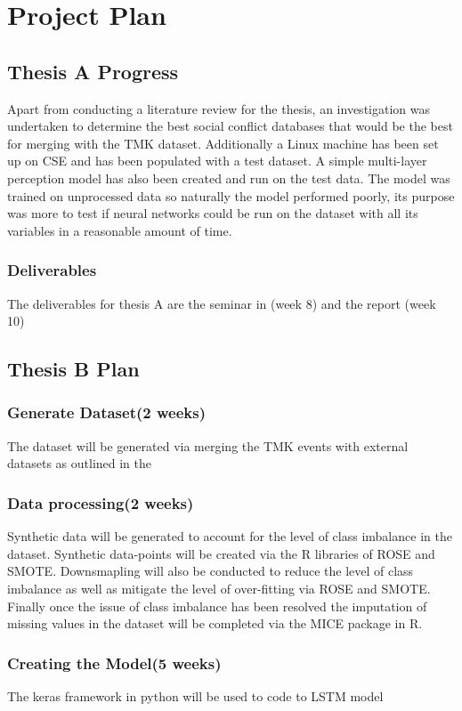 \chapter{Project Plan}\label{ch:projectplan}
\section{Thesis A Progress}
Apart from conducting a literature review for the thesis, an investigation was undertaken to determine the best social conflict databases that would be the best for merging with the TMK dataset. Additionally a Linux machine has been set up on CSE and has been populated with a test dataset. A simple multi-layer perception model has also been created and run on the test data. The model was trained on unprocessed data so naturally the model performed poorly, its purpose was more to test if neural networks could be run on the dataset with all its variables in a reasonable amount of time.
\subsection{Deliverables}
The deliverables for thesis A are the seminar in (week 8) and the report (week 10)
\section{Thesis B Plan}
\subsection{Generate Dataset(2 weeks)}
The dataset will be generated via merging the TMK events with external datasets as outlined in the 
\subsection{Data processing(2 weeks)}
Synthetic data will be generated to account for the level of class imbalance in the dataset. Synthetic data-points will be created via the R libraries of ROSE and SMOTE. Downsmapling will also be conducted to reduce the level of class imbalance as well as mitigate the level of over-fitting via ROSE and SMOTE. Finally once the issue of class imbalance has been resolved the imputation of missing values in the dataset will be completed via the MICE package in R.

\subsection{Creating the Model(5 weeks)}
The keras framework in python will be used to code to LSTM model

